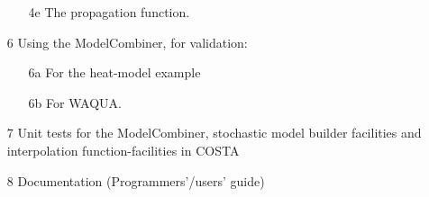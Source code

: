 \documentclass[a4paper,12pt]{article}
\begin{document}
\begin{itemize}
\begin{itemize}
       \item[4e] The propagation function.

     \end{itemize}

  \item[6] Using the ModelCombiner, for validation:
       \begin{itemize}
         \item[6a] For the heat-model example
         \item[6b] For WAQUA.
       \end{itemize}

  \item[7] Unit tests for the ModelCombiner, stochastic model builder
        facilities and 
        interpolation function-facilities in COSTA
  
  \item[8] Documentation (Programmers'/users' guide)

\end{itemize}
\end{document}
